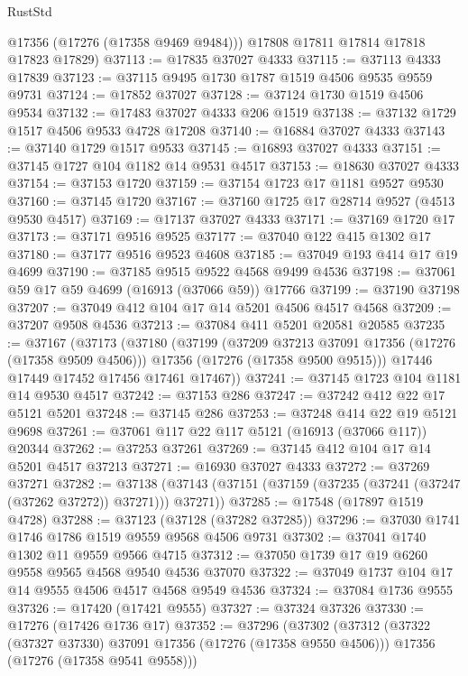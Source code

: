 \begin{lexlean}{RustStd}
\begin{coremodule}
        @17356
        (@17276 (@17358 @9469 @9484)))
      @17808
      @17811
      @17814
      @17818
      @17823
      @17829)
@37113 := @17835 @37027 @4333
@37115 := @37113 @4333 @17839
@37123 := @37115 @9495 @1730 @1787 @1519 @4506 @9535 @9559 @9731
@37124 := @17852 @37027
@37128 := @37124 @1730 @1519 @4506 @9534
@37132 := @17483 @37027 @4333 @206 @1519
@37138 := @37132 @1729 @1517 @4506 @9533 @4728 @17208
@37140 := @16884 @37027 @4333
@37143 := @37140 @1729 @1517 @9533
@37145 := @16893 @37027 @4333
@37151 := @37145 @1727 @104 @1182 @14 @9531 @4517
@37153 := @18630 @37027 @4333
@37154 := @37153 @1720
@37159 := @37154 @1723 @17 @1181 @9527 @9530
@37160 := @37145 @1720
@37167 := @37160 @1725 @17 @28714 @9527 (@4513 @9530 @4517)
@37169 := @17137 @37027 @4333
@37171 := @37169 @1720 @17
@37173 := @37171 @9516 @9525
@37177 := @37040 @122 @415 @1302 @17
@37180 := @37177 @9516 @9523 @4608
@37185 := @37049 @193 @414 @17 @19 @4699
@37190 := @37185 @9515 @9522 @4568 @9499 @4536
@37198 := @37061 @59 @17 @59 @4699 (@16913 (@37066 @59)) @17766
@37199 := @37190 @37198
@37207 := @37049 @412 @104 @17 @14 @5201 @4506 @4517 @4568
@37209 := @37207 @9508 @4536
@37213 := @37084 @411 @5201 @20581 @20585
@37235 := @37167
    (@37173
      (@37180
        (@37199
          (@37209 @37213 @37091 @17356 (@17276 (@17358 @9509 @4506)))
          @17356
          (@17276 (@17358 @9500 @9515)))
        @17446
        @17449
        @17452
        @17456
        @17461
        @17467))
@37241 := @37145 @1723 @104 @1181 @14 @9530 @4517
@37242 := @37153 @286
@37247 := @37242 @412 @22 @17 @5121 @5201
@37248 := @37145 @286
@37253 := @37248 @414 @22 @19 @5121 @9698
@37261 := @37061 @117 @22 @117 @5121 (@16913 (@37066 @117)) @20344
@37262 := @37253 @37261
@37269 := @37145 @412 @104 @17 @14 @5201 @4517 @37213
@37271 := @16930 @37027 @4333
@37272 := @37269 @37271
@37282 := @37138 (@37143 (@37151 (@37159 (@37235 (@37241 (@37247 (@37262 @37272)) @37271))) @37271))
@37285 := @17548 (@17897 @1519 @4728)
@37288 := @37123 (@37128 (@37282 @37285))
@37296 := @37030 @1741 @1746 @1786 @1519 @9559 @9568 @4506 @9731
@37302 := @37041 @1740 @1302 @11 @9559 @9566 @4715
@37312 := @37050 @1739 @17 @19 @6260 @9558 @9565 @4568 @9540 @4536 @37070
@37322 := @37049 @1737 @104 @17 @14 @9555 @4506 @4517 @4568 @9549 @4536
@37324 := @37084 @1736 @9555
@37326 := @17420 (@17421 @9555)
@37327 := @37324 @37326
@37330 := @17276 (@17426 @1736 @17)
@37352 := @37296
    (@37302
      (@37312
        (@37322 (@37327 @37330) @37091 @17356 (@17276 (@17358 @9550 @4506)))
        @17356
        (@17276 (@17358 @9541 @9558)))

\end{coremodule}
\end{lexlean}
